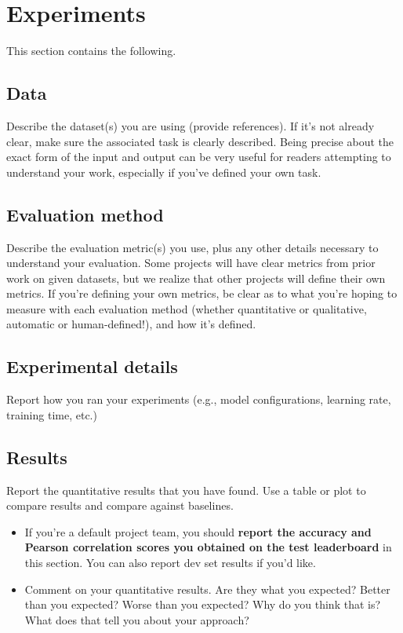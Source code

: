 \documentclass{article}
\begin{document}
\section{Experiments}
This section contains the following.

\subsection{Data}
Describe the dataset(s) you are using (provide references). If it's not already clear, make sure the associated task is clearly described.
Being precise about the exact form of the input and output can be very useful for readers attempting to understand your work, especially if you've defined your own task.

\subsection{Evaluation method}
Describe the evaluation metric(s) you use, plus any other details necessary to understand your evaluation.
Some projects will have clear metrics from prior work on given datasets, but we realize that other projects will define their own metrics.
If you're defining your own metrics, be clear as to what you're hoping to measure with each evaluation method (whether quantitative or qualitative, automatic or human-defined!), and how it's defined.

\subsection{Experimental details}
Report how you ran your experiments (e.g., model configurations, learning rate, training time, etc.)

\subsection{Results}
Report the quantitative results that you have found. Use a table or plot to compare results and compare against baselines.
\begin{itemize}
    \item If you're a default project team, you should \textbf{report the accuracy and Pearson correlation scores you obtained on the test leaderboard} in this section. You can also report dev set results if you'd like. 
    \item Comment on your quantitative results. Are they what you expected? Better than you expected? Worse than you expected? Why do you think that is? What does that tell you about your approach?
\end{itemize}
\end{document}
